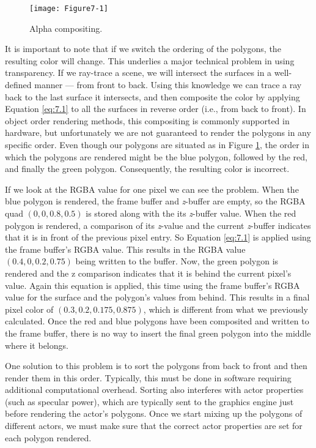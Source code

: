 \begin{figure}[!htb]
	\centering
	\texttt{[image: Figure7-1]}\\
	\caption{Alpha compositing.}\label{fig:Figure7-1}
\end{figure}

It is important to note that if we switch the ordering of the polygons, the resulting color will change. This underlies a major technical problem in using transparency. If we ray-trace a scene, we will intersect the surfaces in a well-defined manner --- from front to back. Using this knowledge we can trace a ray back to the last surface it intersects, and then composite the color by applying Equation \ref{eq:7.1} to all the surfaces in reverse order (i.e., from back to front). In object order rendering methods, this compositing is commonly supported in hardware, but unfortunately we are not guaranteed to render the polygons in any specific order. Even though our polygons are situated as in Figure \ref{fig:Figure7-1}, the order in which the polygons are rendered might be the blue polygon, followed by the red, and finally the green polygon. Consequently, the resulting color is incorrect.

If we look at the RGBA value for one pixel we can see the problem. When the blue polygon is rendered, the frame buffer and \emph{z}-buffer are empty, so the RGBA quad $(0,0,0.8,0.5)$ is stored along with the its \emph{z}-buffer value. When the red polygon is rendered, a comparison of its \emph{z}-value and the current \emph{z}-buffer indicates that it is in front of the previous pixel entry. So Equation \ref{eq:7.1} is applied using the frame buffer’s RGBA value. This results in the RGBA value $(0.4,0,0.2,0.75)$ being written to the buffer. Now, the green polygon is rendered and the z comparison indicates that it is behind the current pixel's value. Again this equation is applied, this time using the frame buffer's RGBA value for the surface and the polygon’s values from behind. This results in a final pixel color of $(0.3,0.2, 0.175,0.875)$, which is different from what we previously calculated. Once the red and blue polygons have been composited and written to the frame buffer, there is no way to insert the final green polygon into the middle where it belongs.

One solution to this problem is to sort the polygons from back to front and then render them in this order. Typically, this must be done in software requiring additional computational overhead. Sorting also interferes with actor properties (such as specular power), which are typically sent to the graphics engine just before rendering the actor's polygons. Once we start mixing up the polygons of different actors, we must make sure that the correct actor properties are set for each polygon rendered.

